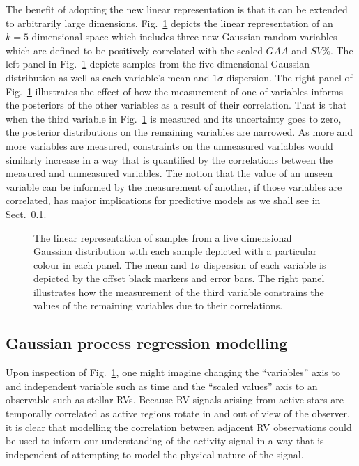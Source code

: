 The benefit of adopting the new linear representation is that it can be extended to
arbitrarily large dimensions. Fig.~\ref{fig:linrepv2} depicts the linear representation
of an $k=5$ dimensional space which includes three new Gaussian random variables which
are defined to be positively correlated with the scaled $GAA$ and $SV$\%. The left panel
in Fig.~\ref{fig:linrepv2} depicts samples from the five dimensional Gaussian distribution
as well as each variable's mean and $1\sigma$ dispersion. The right panel of
Fig.~\ref{fig:linrepv2} illustrates the effect of how the measurement of one of variables
informs the posteriors of the other variables as a result of their correlation. That is
that when the third variable in Fig.~\ref{fig:linrepv2} is measured and its uncertainty
goes to zero, the posterior distributions on the remaining variables are narrowed. As
more and more variables are measured, constraints on the unmeasured variables would
similarly increase in a way that is quantified by the correlations between the
measured and unmeasured variables.
The notion that the value of an unseen variable can be informed by the measurement
of another, if those variables are correlated, has major implications for
predictive models as we shall see in Sect.~\ref{sect:regression}. \\

\begin{figure}
  \centering
  \caption[Linear representation of Gaussian random variables in five dimensions.]
          {The linear representation of samples from a five dimensional Gaussian
            distribution with each sample depicted with a particular colour in each
            panel. The mean and $1\sigma$ dispersion of each variable is depicted
            by the offset black markers and error bars. The right panel illustrates
            how the measurement of the third variable constrains the values of the
            remaining variables due to their correlations.}
  \label{fig:linrepv2}
\end{figure}


\subsection{Gaussian process regression modelling} \label{sect:regression}
Upon inspection of Fig.~\ref{fig:linrepv2}, one might imagine changing the ``variables''
axis to and independent variable such as time and the ``scaled values'' axis to an
observable such as stellar RVs. Because RV signals arising from active stars are temporally
correlated as active regions rotate in and out of view of the observer, it is clear that
modelling the correlation between adjacent RV observations could be used to inform
our understanding of the activity signal in a way that is independent of attempting to
model the physical nature of the signal. \\

